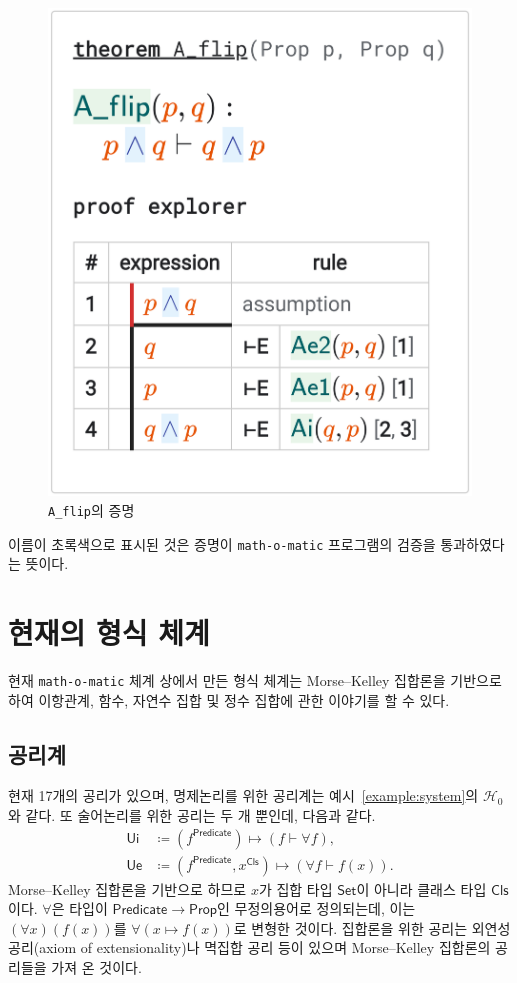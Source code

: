 \documentclass[10pt,twocolumn]{article}
\theoremstyle{definition}
\newcommand{\Prop}{\mathsf{Prop}}
\newcommand{\Set}{\mathsf{Set}}
\newcommand{\Cls}{\mathsf{Cls}}
\begin{document}
\begin{figure}[hbt!] \centering
	\includegraphics[scale=.18]{A_flip}
	\caption{\texttt{A\_flip}의 증명} \label{fig:Aflip}
\end{figure}

이름이 초록색으로 표시된 것은 증명이 \texttt{math-o-matic} 프로그램의 검증을 통과하였다는 뜻이다.

\section{현재의 형식 체계}

현재 \texttt{math-o-matic} 체계 상에서 만든 형식 체계는 Morse--Kelley 집합론을 기반으로 하여 이항관계, 함수, 자연수 집합 및 정수 집합에 관한 이야기를 할 수 있다.

\subsection{공리계}

현재 17개의 공리가 있으며, 명제논리를 위한 공리계는 예시~\ref{example:system}의 $\mathcal H_0$와 같다. 또 술어논리를 위한 공리는 두 개 뿐인데, 다음과 같다.
\begin{align*}
	\mathsf{Ui}&\coloneqq (f^{\mathsf{Predicate}})\mapsto (f\vdash\forall f), \\
	\mathsf{Ue}&\coloneqq (f^{\mathsf{Predicate}}, x^\Cls)\mapsto (\forall f\vdash f(x)).
\end{align*}
Morse--Kelley 집합론을 기반으로 하므로 $x$가 집합 타입 $\Set$이 아니라 클래스 타입 $\Cls$이다. $\forall$은 타입이 $\mathsf{Predicate}\to\Prop$인 무정의용어로 정의되는데, 이는 $(\forall x)(f(x))$를 $\forall(x\mapsto f(x))$로 변형한 것이다. 집합론을 위한 공리는 외연성 공리(axiom of extensionality)나 멱집합 공리 등이 있으며 Morse--Kelley 집합론의 공리들을 가져 온 것이다.
\end{document}
